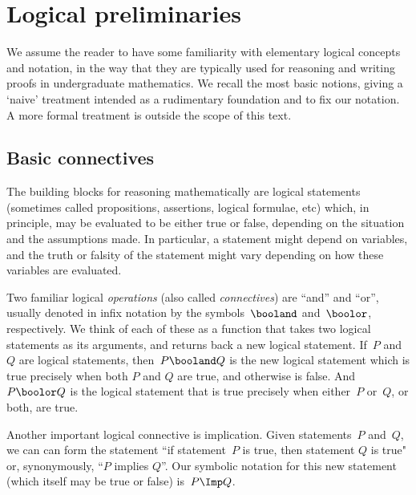 
\section{Logical preliminaries}
\label{sec:logical-prelim}

We assume the reader to have some familiarity with elementary logical concepts and notation, in the way that they are typically used for reasoning and writing proofs in undergraduate mathematics.
We recall the most basic notions, giving a `naive' treatment  intended as a rudimentary foundation and to fix our notation.
A more formal treatment is outside the scope of this text.

\subsection{Basic connectives}

The building blocks for reasoning mathematically are logical statements (sometimes called propositions, assertions, logical formulae, etc) which, in principle, may be evaluated to be either true or false, depending on the situation and the assumptions made.
In particular, a statement might depend on variables, and the truth or falsity of the statement might vary depending on how these variables are evaluated.

Two familiar logical \emph{operations} (also called \emph{connectives}) are ``and'' and ``or'', usually denoted in infix notation by the symbols~$\booland$ and~$\boolor$, respectively.
We think of each of these as a function that takes two logical statements as its arguments, and returns back a new logical statement.
If~$P$ and~$Q$ are logical statements, then~$P \booland Q$ is the new logical statement which is true precisely when both $P$ and $Q$ are true, and otherwise is false.
And~$P \boolor Q$ is the logical statement that is true precisely when either~$P$ or~$Q$, or both, are true.

Another important logical connective is implication.
Given statements~$P$ and~$Q$, we can can form the statement ``if statement~$P$ is true, then statement $Q$ is true" or, synonymously, ``$P$ implies $Q$''.
Our symbolic notation for this new statement (which itself may be true or false) is~$P \Imp Q$.



